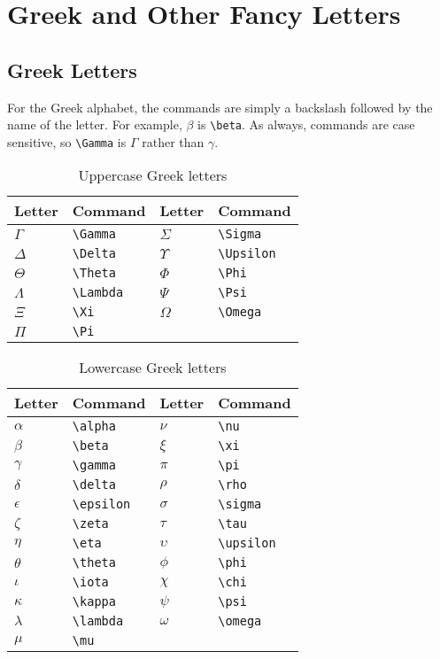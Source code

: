\section{Greek and Other Fancy Letters}
\label{sec:greek-other-fancy}

\subsection{Greek Letters}
\label{sec:greek-letters}

For the Greek alphabet, the commands are simply a backslash followed
by the name of the letter.  For example, $\beta$ is \verb?\beta?.  As
always, commands are case sensitive, so \verb?\Gamma? is $\Gamma$
rather than $\gamma$.
\begin{table}
  \centering
  \caption{Uppercase Greek letters}
  \label{tab:uppercase-greek}
  \begin{tabular}{@{}llll@{}}
    \toprule
    Letter & Command & Letter & Command \\
    \midrule
    $\Gamma$ & \verb?\Gamma? & $\Sigma$ & \verb?\Sigma? \\
    $\Delta$ & \verb?\Delta? & $\Upsilon$ & \verb?\Upsilon?
    \\
    $\Theta$ & \verb?\Theta? & $\Phi$ & \verb?\Phi? \\
    $\Lambda$ & \verb?\Lambda? & $\Psi$ & \verb?\Psi? \\
    $\Xi$ & \verb?\Xi? & $\Omega$ & \verb?\Omega? \\
    $\Pi$ & \verb?\Pi? & & \\
    \bottomrule
  \end{tabular}
\end{table}
\begin{table}
  \centering
  \caption{Lowercase Greek letters}
  \label{tab:lowercase-greek}
  \begin{tabular}{@{}llll@{}}
    \toprule
    Letter & Command & Letter & Command \\
    \midrule
    $\alpha$ & \verb?\alpha? & $\nu$ & \verb?\nu? \\
    $\beta$ & \verb?\beta? & $\xi$ & \verb?\xi? \\
    $\gamma$ & \verb?\gamma? & $\pi$ & \verb?\pi? \\
    $\delta$ & \verb?\delta? & $\rho$ & \verb?\rho? \\
    $\epsilon$ & \verb?\epsilon? & $\sigma$ & \verb?\sigma?
    \\
    $\zeta$ & \verb?\zeta? & $\tau$ & \verb?\tau? \\
    $\eta$ & \verb?\eta? & $\upsilon$ & \verb?\upsilon? \\
    $\theta$ & \verb?\theta? & $\phi$ & \verb?\phi? \\
    $\iota$ & \verb?\iota? & $\chi$ & \verb?\chi? \\
    $\kappa$ & \verb?\kappa? & $\psi$ & \verb?\psi? \\
    $\lambda$ & \verb?\lambda? & $\omega$ & \verb?\omega? \\
    $\mu$ & \verb?\mu? & & \\
    \bottomrule
  \end{tabular}
\end{table}

